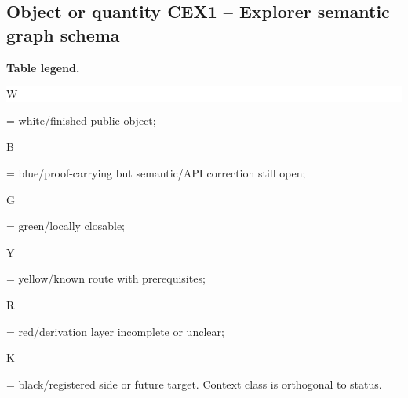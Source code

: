 \subsection*{Object or quantity CEX1 -- Explorer semantic graph schema}
\hypertarget{objproof:CEX1}{}
\par\smallskip\noindent\begin{minipage}{0.99\linewidth}\footnotesize\raggedright\textbf{Table legend.} \colorbox{white}{\strut W} = white/finished public object; \colorbox{cyan!20}{\strut B} = blue/proof-carrying but semantic/API correction still open; \colorbox{green!18}{\strut G} = green/locally closable; \colorbox{yellow!25}{\strut Y} = yellow/known route with prerequisites; \colorbox{red!20}{\strut R} = red/derivation layer incomplete or unclear; \colorbox{black!18}{\strut K} = black/registered side or future target. Context class is orthogonal to status.\end{minipage}\par\vspace{0.25em}
